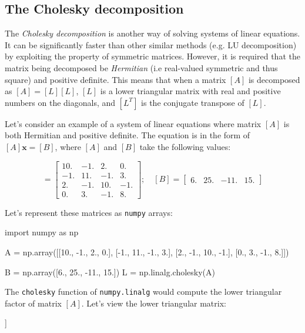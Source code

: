 \subsection{The Cholesky decomposition}
\label{sec:cholesky}
The \emph{Cholesky decomposition} is another way of solving systems of linear equations. It can be significantly faster than other similar methods (e.g. LU decomposition) by exploiting the property of symmetric matrices. However, it is required that the matrix being decomposed be \emph{Hermitian} (i.e real-valued symmetric and thus square) and positive definite. This means that when a matrix $[A]$ is decomposed as $[A] = [L][L]$, $[L]$ is a lower triangular matrix with real and positive numbers on the diagonals, and $[L^T]$ is the conjugate transpose of $[L]$.

Let's consider an example of a system of linear equations where matrix $[A]$ is both Hermitian and positive definite. The equation is in the form of $[A]\boldsymbol{x} = [B]$, where $[A]$ and $[B]$ take the following values:

\begin{equation*}
[A] = \begin{bmatrix}
10.& -1.& 2.& 0.\\ 
-1.& 11.& -1.& 3.\\ 
2.& -1.& 10.& -1.\\
0.& 3.& -1.& 8.
\end{bmatrix};\quad
[B] = \begin{bmatrix}
	6.& 25.& -11.& 15.
\end{bmatrix}
\end{equation*}

Let's represent these matrices as \texttt{numpy} arrays:

\begin{ipython}
import numpy as np

A = np.array([[10., -1., 2., 0.], 
              [-1., 11., -1., 3.], 
              [2., -1., 10., -1.],
              [0., 3., -1., 8.]]) 

B = np.array([6., 25., -11., 15.])
L = np.linalg.cholesky(A)
\end{ipython}

The \texttt{cholesky} function of \texttt{numpy.linalg} would compute the lower triangular factor of matrix $[A]$. Let's view the lower triangular matrix:

\begin{ipython}
print (L}
\end{ipython}
\begin{ioutput}
[[ 3.16227766  0.         0.         0.        ]
 [-0.31622777  3.3015148  0.         0.        ] 
 [ 0.63245553 -0.24231301 3.08889696 0.        ] 
 [ 0.          0.9086738 -0.25245792 2.6665665 ]]
\end{ioutput}

